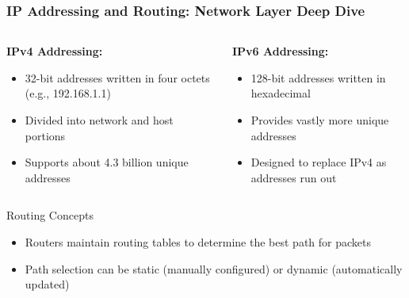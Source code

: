 \documentclass{beamer}
\begin{document}
\begin{frame}
    \frametitle{IP Addressing and Routing: Network Layer Deep Dive}
    
    \begin{columns}[t]
        \begin{column}{0.5\textwidth}
            \textbf{IPv4 Addressing:}
            \begin{itemize}
                \item 32-bit addresses written in four octets (e.g., 192.168.1.1)
                \item Divided into network and host portions
                \item Supports about 4.3 billion unique addresses
            \end{itemize}
        \end{column}
        
        \begin{column}{0.5\textwidth}
            \textbf{IPv6 Addressing:}
            \begin{itemize}
                \item 128-bit addresses written in hexadecimal
                \item Provides vastly more unique addresses
                \item Designed to replace IPv4 as addresses run out
            \end{itemize}
        \end{column}
    \end{columns}
    
    \begin{block}{Routing Concepts}
        \begin{itemize}
            \item Routers maintain routing tables to determine the best path for packets
            \item Path selection can be static (manually configured) or dynamic (automatically updated)
        \end{itemize}
    \end{block}
\end{frame}
\end{document}
